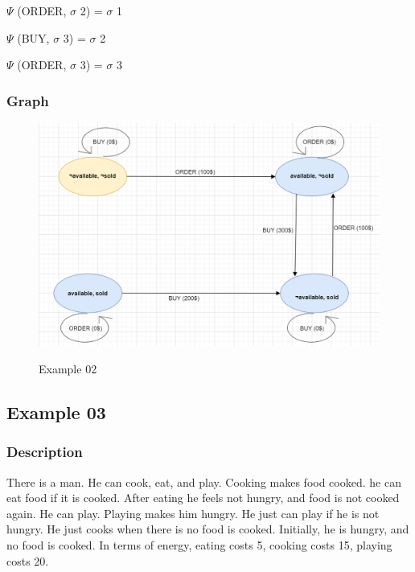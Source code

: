 \documentclass[11pt]{article}
\begin{document}
	\(  \Psi  \)  (ORDER, $ \sigma $ 2) = $ \sigma $ 1\par
	
	\(  \Psi  \)  (BUY, $ \sigma $ 3) = $ \sigma $ 2\par
	
	\(  \Psi  \)  (ORDER, $ \sigma $ 3) = $ \sigma $ 3\par
	\subsubsection{Graph}\label{par:p402}
	\begin{figure}[H]
		\includegraphics[width=1\linewidth, height=0.3\textheight]{./media/image1.png}
		\label{Figure:f02}
		\caption{Example 02}
	\end{figure}
	\subsection{Example 03}
	\subsubsection{Description}\label{par:p103}
	There is a man. He can cook, eat, and play. Cooking makes food cooked. he can eat food if it is cooked. After eating he feels not hungry, and food is not cooked again. He can play. Playing makes him hungry. He just can play if he is not hungry. He just cooks when there is no food is cooked. Initially, he is hungry, and no food is cooked. In terms of energy, eating costs 5, cooking costs 15, playing costs 20.\\
	\\
\end{document}
